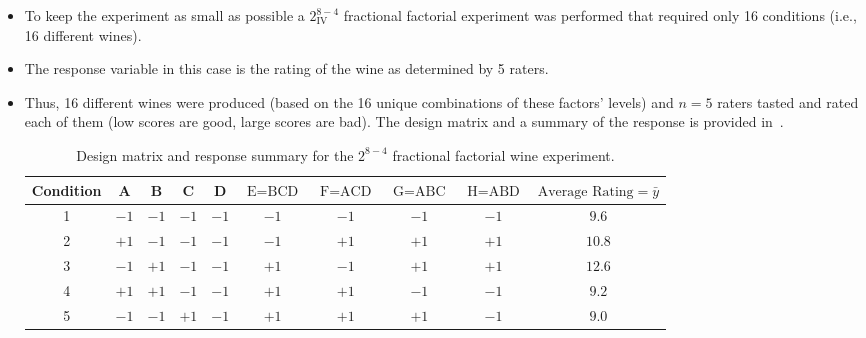 \begin{itemize}
\begin{table}[!htbp]
\begin{tabular}{lcc}
                        \bottomrule
                  \end{tabular}
            \end{table}
      \item To keep the experiment as small as possible a $ 2^{8-4}_{\text{IV}} $ fractional factorial experiment was performed that
            required only 16 conditions (i.e., 16 different wines).
      \item The response variable in this case is the rating of the wine as determined by 5 raters.
      \item Thus, 16 different wines were produced (based on the 16 unique combinations of these factors' levels)
            and $n = 5$ raters tasted and rated each of them (low scores are good, large scores are bad). The design
            matrix and a summary of the response is provided in~.
            \begin{table}[!htbp]
                  \centering
                  \caption{Design matrix and response summary for the $2^{8-4}$ fractional factorial wine experiment.}\label{tab:wine2}
                  \begin{tabular}{cccccccccc}
                        \toprule
                        Condition & A    & B    & C    & D    & $\text{E}=\text{BCD}$ & $\text{F}=\text{ACD}$ & $\text{G}=\text{ABC}$ & $\text{H}=\text{ABD}$ & $\text{Average Rating}=\bar{y}$ \\
                        \midrule
                        1         & $-1$ & $-1$ & $-1$ & $-1$ & $-1$                  & $-1$                  & $-1$                  & $-1$                  & $9.6$                           \\
                        2         & $+1$ & $-1$ & $-1$ & $-1$ & $-1$                  & $+1$                  & $+1$                  & $+1$                  & $10.8$                          \\
                        3         & $-1$ & $+1$ & $-1$ & $-1$ & $+1$                  & $-1$                  & $+1$                  & $+1$                  & $12.6$                          \\
                        4         & $+1$ & $+1$ & $-1$ & $-1$ & $+1$                  & $+1$                  & $-1$                  & $-1$                  & $9.2$                           \\
                        5         & $-1$ & $-1$ & $+1$ & $-1$ & $+1$                  & $+1$                  & $+1$                  & $-1$                  & $9.0$                           \\

\end{tabular}
\end{table}
\end{itemize}
